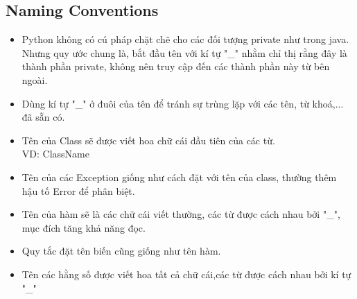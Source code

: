 \documentclass[a4paper]{report}
\begin{document}
	\subsection{Naming Conventions}
	\begin{itemize}
		\item Python không có cú pháp chặt chẽ cho các đối tượng private như trong java. Nhưng quy ước chung là, bắt đầu tên 		với kí tự "\_" nhằm chỉ thị rằng đây là thành phần private, 
		không nên truy cập đến các thành phần này từ bên ngoài.
		\item Dùng kí tự "\_" ở đuôi của tên để tránh sự trùng lặp với các tên, từ khoá,...
		đã sẵn có.
		\item Tên của Class sẽ được viết hoa chữ cái đầu tiên của các từ. \\
		VD: ClassName
		\item Tên của các Exception giống như cách đặt với tên của class, thường thêm 
		hậu tố Error để phân biệt.
		\item Tên của hàm sẽ là các chữ cái viết thường, các từ được cách nhau bởi "\_", mục 
		đích tăng khả năng đọc.
		\item Quy tắc đặt tên biến cũng giống như tên hàm.
		\item Tên các hằng số được viết hoa tất cả chữ cái,các từ được cách nhau bởi kí tự "\_"
	\end{itemize}
\end{document}
